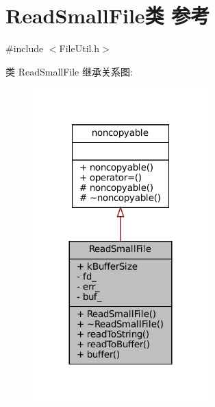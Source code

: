 \hypertarget{classmuduo_1_1FileUtil_1_1ReadSmallFile}{}\section{Read\+Small\+File类 参考}
\label{classmuduo_1_1FileUtil_1_1ReadSmallFile}


{\ttfamily \#include $<$File\+Util.\+h$>$}



类 Read\+Small\+File 继承关系图\+:
\nopagebreak
\begin{figure}[H]
\begin{center}
\leavevmode
\includegraphics[width=192pt]{classmuduo_1_1FileUtil_1_1ReadSmallFile__inherit__graph}
\end{center}
\end{figure}


